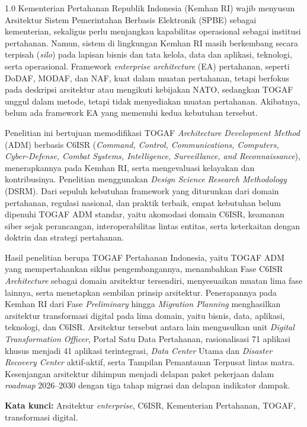 \begin{spacing}{1.0}
Kementerian Pertahanan Republik Indonesia (Kemhan RI) wajib menyusun Arsitektur Sistem Pemerintahan Berbasis Elektronik (SPBE) sebagai kementerian, sekaligus perlu menjangkau kapabilitas operasional sebagai institusi pertahanan. Namun, sistem di lingkungan Kemhan RI masih berkembang secara terpisah (\textit{silo}) pada lapisan bisnis dan tata kelola, data dan aplikasi, teknologi, serta operasional. Framework \textit{enterprise architecture} (EA) pertahanan, seperti DoDAF, MODAF, dan NAF, kuat dalam muatan pertahanan, tetapi berfokus pada deskripsi arsitektur atau mengikuti kebijakan NATO, sedangkan TOGAF unggul dalam metode, tetapi tidak menyediakan muatan pertahanan. Akibatnya, belum ada framework EA yang memenuhi kedua kebutuhan tersebut.

Penelitian ini bertujuan memodifikasi TOGAF \textit{Architecture Development Method} (ADM) berbasis C6ISR (\textit{Command, Control, Communications, Computers, Cyber-Defense, Combat Systems, Intelligence, Surveillance, and Reconnaissance}), menerapkannya pada Kemhan RI, serta mengevaluasi kelayakan dan kontribusinya. Penelitian menggunakan \textit{Design Science Research Methodology} (DSRM). Dari sepuluh kebutuhan framework yang diturunkan dari domain pertahanan, regulasi nasional, dan praktik terbaik, empat kebutuhan belum dipenuhi TOGAF ADM standar, yaitu akomodasi domain C6ISR, keamanan siber sejak perancangan, interoperabilitas lintas entitas, serta keterkaitan dengan doktrin dan strategi pertahanan.

Hasil penelitian berupa TOGAF Pertahanan Indonesia, yaitu TOGAF ADM yang mempertahankan siklus pengembangannya, menambahkan Fase C6ISR \textit{Architecture} sebagai domain arsitektur tersendiri, menyesuaikan muatan lima fase lainnya, serta menetapkan sembilan prinsip arsitektur. Penerapannya pada Kemhan RI dari Fase \textit{Preliminary} hingga \textit{Migration Planning} menghasilkan arsitektur transformasi digital pada lima domain, yaitu bisnis, data, aplikasi, teknologi, dan C6ISR. Arsitektur tersebut antara lain mengusulkan unit \textit{Digital Transformation Officer}, Portal Satu Data Pertahanan, rasionalisasi 71 aplikasi khusus menjadi 41 aplikasi terintegrasi, \textit{Data Center} Utama dan \textit{Disaster Recovery Center} aktif-aktif, serta Tampilan Pemantauan Terpusat lintas matra. Kesenjangan arsitektur dihimpun menjadi delapan paket pekerjaan dalam \textit{roadmap} 2026--2030 dengan tiga tahap migrasi dan delapan indikator dampak.

\vspace{0.4cm}
\noindent\textbf{Kata kunci:} Arsitektur \textit{enterprise}, C6ISR, Kementerian Pertahanan, TOGAF, transformasi digital.
\end{spacing}
